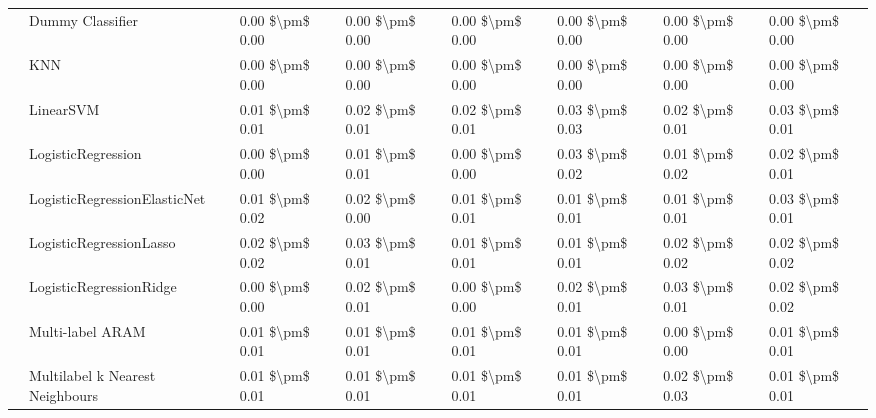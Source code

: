 \begin{tabular}{llllllll}
   & Dummy Classifier &  0.00 \$\textbackslash pm\$ 0.00 &           0.00 \$\textbackslash pm\$ 0.00 &       0.00 \$\textbackslash pm\$ 0.00 &        0.00 \$\textbackslash pm\$ 0.00 &                         0.00 \$\textbackslash pm\$ 0.00 &      0.00 \$\textbackslash pm\$ 0.00 \\
   & KNN &  0.00 \$\textbackslash pm\$ 0.00 &           0.00 \$\textbackslash pm\$ 0.00 &       0.00 \$\textbackslash pm\$ 0.00 &        0.00 \$\textbackslash pm\$ 0.00 &                         0.00 \$\textbackslash pm\$ 0.00 &      0.00 \$\textbackslash pm\$ 0.00 \\
   & LinearSVM &  0.01 \$\textbackslash pm\$ 0.01 &           0.02 \$\textbackslash pm\$ 0.01 &       0.02 \$\textbackslash pm\$ 0.01 &        0.03 \$\textbackslash pm\$ 0.03 &                         0.02 \$\textbackslash pm\$ 0.01 &      0.03 \$\textbackslash pm\$ 0.01 \\
   & LogisticRegression &  0.00 \$\textbackslash pm\$ 0.00 &           0.01 \$\textbackslash pm\$ 0.01 &       0.00 \$\textbackslash pm\$ 0.00 &        0.03 \$\textbackslash pm\$ 0.02 &                         0.01 \$\textbackslash pm\$ 0.02 &      0.02 \$\textbackslash pm\$ 0.01 \\
   & LogisticRegressionElasticNet &  0.01 \$\textbackslash pm\$ 0.02 &           0.02 \$\textbackslash pm\$ 0.00 &       0.01 \$\textbackslash pm\$ 0.01 &        0.01 \$\textbackslash pm\$ 0.01 &                         0.01 \$\textbackslash pm\$ 0.01 &      0.03 \$\textbackslash pm\$ 0.01 \\
   & LogisticRegressionLasso &  0.02 \$\textbackslash pm\$ 0.02 &           0.03 \$\textbackslash pm\$ 0.01 &       0.01 \$\textbackslash pm\$ 0.01 &        0.01 \$\textbackslash pm\$ 0.01 &                         0.02 \$\textbackslash pm\$ 0.02 &      0.02 \$\textbackslash pm\$ 0.02 \\
   & LogisticRegressionRidge &  0.00 \$\textbackslash pm\$ 0.00 &           0.02 \$\textbackslash pm\$ 0.01 &       0.00 \$\textbackslash pm\$ 0.00 &        0.02 \$\textbackslash pm\$ 0.01 &                         0.03 \$\textbackslash pm\$ 0.01 &      0.02 \$\textbackslash pm\$ 0.02 \\
   & Multi-label ARAM &  0.01 \$\textbackslash pm\$ 0.01 &           0.01 \$\textbackslash pm\$ 0.01 &       0.01 \$\textbackslash pm\$ 0.01 &        0.01 \$\textbackslash pm\$ 0.01 &                         0.00 \$\textbackslash pm\$ 0.00 &      0.01 \$\textbackslash pm\$ 0.01 \\
   & Multilabel k Nearest Neighbours &  0.01 \$\textbackslash pm\$ 0.01 &           0.01 \$\textbackslash pm\$ 0.01 &       0.01 \$\textbackslash pm\$ 0.01 &        0.01 \$\textbackslash pm\$ 0.01 &                         0.02 \$\textbackslash pm\$ 0.03 &      0.01 \$\textbackslash pm\$ 0.01 \\

\end{tabular}
